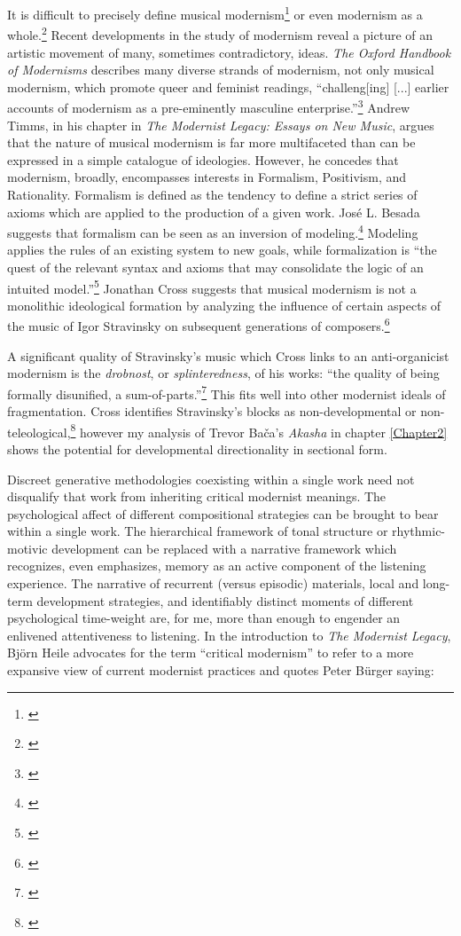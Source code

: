 It is difficult to precisely define musical modernism\footnote{\citet[15]{legacy}} or even modernism as a whole.\footnote{\citet[2]{oxford-modernisms}} Recent developments in the study of modernism reveal a picture of an artistic movement of many, sometimes contradictory, ideas. \textit{The Oxford Handbook of Modernisms} describes many diverse strands of modernism, not only musical modernism, which promote queer and feminist readings, ``challeng[ing] [...] earlier accounts of modernism as a pre-eminently masculine enterprise.''\footnote{\citet[1]{oxford-modernisms}} Andrew Timms, in his chapter in \textit{The Modernist Legacy: Essays on New Music}, argues that the nature of musical modernism is far more multifaceted than can be expressed in a simple catalogue of ideologies. However, he concedes that modernism, broadly, encompasses interests in Formalism, Positivism, and Rationality. Formalism is defined as the tendency to define a strict series of axioms which are applied to the production of a given work. José L. Besada suggests that formalism can be seen as an inversion of modeling.\footnote{\citet[50]{besada}} Modeling applies the rules of an existing system to new goals, while formalization is ``the quest of the relevant syntax and axioms that may consolidate the logic of an intuited model.''\footnote{\citet[50]{besada}} Jonathan Cross suggests that musical modernism is not a monolithic ideological formation by analyzing the influence of certain aspects of the music of Igor Stravinsky on subsequent generations of composers.\footnote{\citet[4]{cross}}

A significant quality of Stravinsky's music which Cross links to an anti-organicist modernism is the \textit{drobnost}, or \textit{splinteredness}, of his works: ``the quality of being formally disunified, a sum-of-parts.''\footnote{\citet[10]{cross}} This fits well into other modernist ideals of fragmentation. Cross identifies Stravinsky's blocks as non-developmental or non-teleological,\footnote{\citet[10]{cross}} however my analysis of Trevor Bača's \textit{Akasha} in chapter \vref{Chapter2} shows the potential for developmental directionality in sectional form.

Discreet generative methodologies coexisting within a single work need not disqualify that work from inheriting critical modernist meanings. The psychological affect of different compositional strategies can be brought to bear within a single work. The hierarchical framework of tonal structure or rhythmic-motivic development can be replaced with a narrative framework which recognizes, even emphasizes, memory as an active component of the listening experience. The narrative of recurrent (versus episodic) materials, local and long-term development strategies, and identifiably distinct moments of different psychological time-weight are, for me, more than enough to engender an enlivened attentiveness to listening. In the introduction to \textit{The Modernist Legacy}, Björn Heile advocates for the term ``critical modernism'' to refer to a more expansive view of current modernist practices and quotes Peter Bürger saying:

